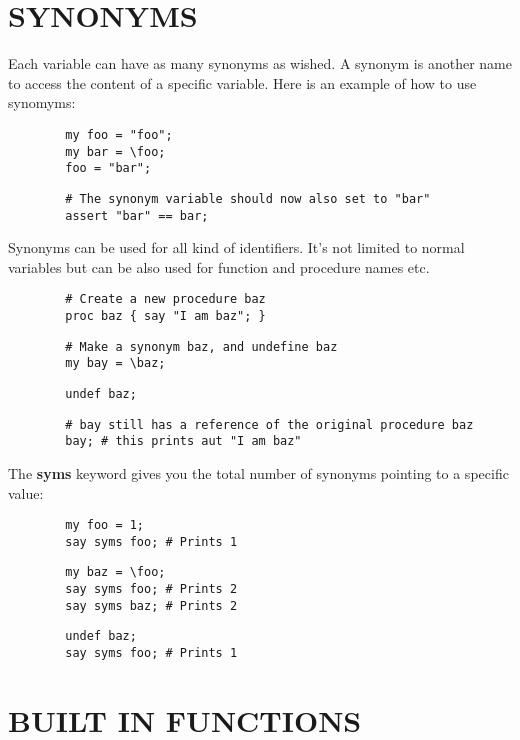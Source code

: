 \section{SYNONYMS\label{SYNONYMS}}


Each variable can have as many synonyms as wished. A synonym is another name to access the content of a specific variable. Here is an example of how to use synomyms:

\begin{verbatim}
        my foo = "foo";
        my bar = \foo;
        foo = "bar";
\end{verbatim}
\begin{verbatim}
        # The synonym variable should now also set to "bar"
        assert "bar" == bar;
\end{verbatim}


Synonyms can be used for all kind of identifiers. It's not limited to normal variables but can be also used for function and procedure names etc.

\begin{verbatim}
        # Create a new procedure baz
        proc baz { say "I am baz"; }
\end{verbatim}
\begin{verbatim}
        # Make a synonym baz, and undefine baz
        my bay = \baz;
\end{verbatim}
\begin{verbatim}
        undef baz;
\end{verbatim}
\begin{verbatim}
        # bay still has a reference of the original procedure baz
        bay; # this prints aut "I am baz"
\end{verbatim}


The \textbf{syms} keyword gives you the total number of synonyms pointing to a specific value:

\begin{verbatim}
        my foo = 1;
        say syms foo; # Prints 1
\end{verbatim}
\begin{verbatim}
        my baz = \foo; 
        say syms foo; # Prints 2
        say syms baz; # Prints 2
\end{verbatim}
\begin{verbatim}
        undef baz;
        say syms foo; # Prints 1
\end{verbatim}
\section{BUILT IN FUNCTIONS\label{BUILT_IN_FUNCTIONS}}


